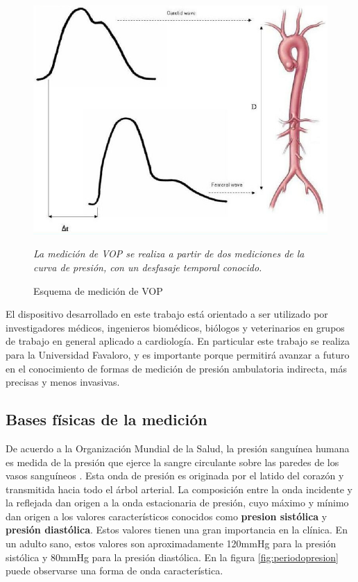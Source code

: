 \begin{figure}[!htbp]
	\centering
	\begin{minipage}{0.65\textwidth}
		\includegraphics[width=\textwidth]{./Figures/VOP.jpg}
		{\footnotesize 	\textit{La medición de VOP se realiza a partir de dos mediciones de la curva de presión, con un desfasaje temporal conocido.} \par}		
	\end{minipage}
	\caption{Esquema de medición de VOP}
	\label{fig:vop}
\end{figure}

El dispositivo desarrollado en este trabajo está orientado a ser utilizado por investigadores médicos, ingenieros biomédicos, biólogos y veterinarios en grupos de trabajo en general aplicado a cardiología. En particular este trabajo se realiza para la Universidad Favaloro, y es importante porque permitirá avanzar a futuro en el conocimiento de formas de medición de presión ambulatoria indirecta, más precisas y menos invasivas.

\subsection{Bases físicas de la medición}

De acuerdo a la Organización Mundial de la Salud, la presión sanguínea humana es medida de la presión que ejerce la sangre circulante sobre las paredes de los vasos sanguíneos \cite{who2015}. Esta onda de presión es originada por el latido del corazón y transmitida hacia todo el árbol arterial. La composición entre la onda incidente y la reflejada dan origen a la onda estacionaria de presión, cuyo máximo y mínimo dan origen a los valores característicos conocidos como \textbf{presion sistólica} y \textbf{presión diastólica}. Estos valores tienen una gran importancia en la clínica. En un adulto sano, estos valores son aproximadamente 120mmHg para la presión sistólica y 80mmHg para la presión diastólica. En la figura \ref{fig:periodopresion} puede observarse una forma de onda característica.

